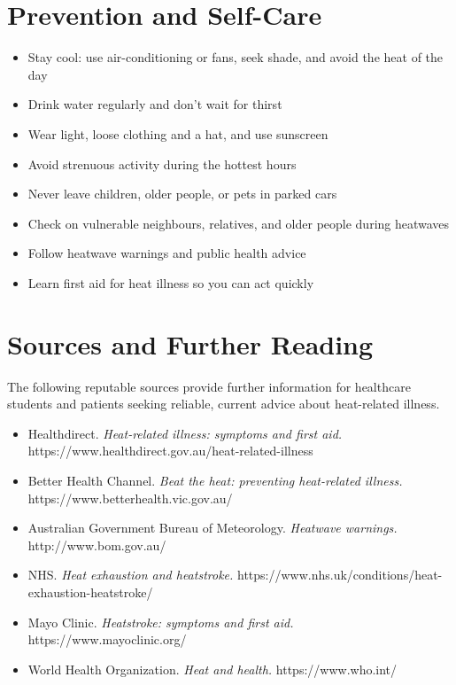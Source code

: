 \section*{Prevention and Self-Care}
\begin{itemize}
    \item Stay cool: use air-conditioning or fans, seek shade, and avoid the heat of the day
    \item Drink water regularly and don't wait for thirst
    \item Wear light, loose clothing and a hat, and use sunscreen
    \item Avoid strenuous activity during the hottest hours
    \item Never leave children, older people, or pets in parked cars
    \item Check on vulnerable neighbours, relatives, and older people during heatwaves
    \item Follow heatwave warnings and public health advice
    \item Learn first aid for heat illness so you can act quickly
\end{itemize}

\section*{Sources and Further Reading}
The following reputable sources provide further information for healthcare students and patients seeking reliable, current advice about heat-related illness.

\begin{itemize}
    \item Healthdirect. \textit{Heat-related illness: symptoms and first aid.} https://www.healthdirect.gov.au/heat-related-illness
    \item Better Health Channel. \textit{Beat the heat: preventing heat-related illness.} https://www.betterhealth.vic.gov.au/
    \item Australian Government Bureau of Meteorology. \textit{Heatwave warnings.} http://www.bom.gov.au/
    \item NHS. \textit{Heat exhaustion and heatstroke.} https://www.nhs.uk/conditions/heat-exhaustion-heatstroke/
    \item Mayo Clinic. \textit{Heatstroke: symptoms and first aid.} https://www.mayoclinic.org/
    \item World Health Organization. \textit{Heat and health.} https://www.who.int/
\end{itemize}
